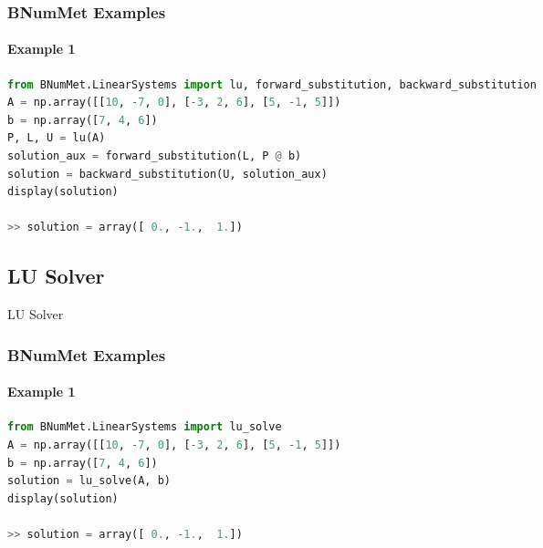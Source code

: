\subsubsection{BNumMet Examples}
\paragraph{Example 1}{
\begin{lstlisting}[language=Python]
from BNumMet.LinearSystems import lu, forward_substitution, backward_substitution
A = np.array([[10, -7, 0], [-3, 2, 6], [5, -1, 5]])
b = np.array([7, 4, 6])
P, L, U = lu(A)
solution_aux = forward_substitution(L, P @ b)
solution = backward_substitution(U, solution_aux)
display(solution)

>> solution = array([ 0., -1.,  1.])
\end{lstlisting}
}

\subsection{LU Solver}
\begin{algorithm}[H] 
\SetAlgoLined
{}
\caption{LU Solver}
\end{algorithm}
\subsubsection{BNumMet Examples}
\paragraph{Example 1}{
\begin{lstlisting}[language=Python]
from BNumMet.LinearSystems import lu_solve
A = np.array([[10, -7, 0], [-3, 2, 6], [5, -1, 5]])
b = np.array([7, 4, 6])
solution = lu_solve(A, b)
display(solution)

>> solution = array([ 0., -1.,  1.])
\end{lstlisting}
}

